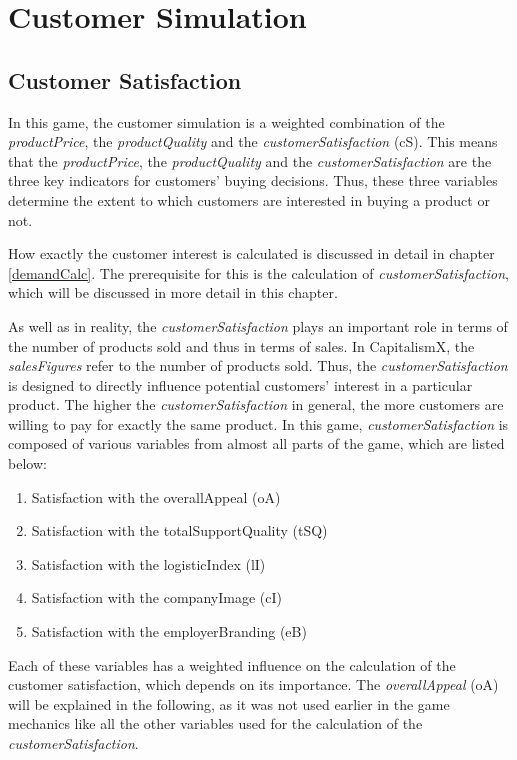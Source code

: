 \section{Customer Simulation} \label{sec:customsim}

\subsection{Customer Satisfaction}
In this game, the customer simulation is a weighted combination of the \textit{productPrice}, the \textit{productQuality} and the \textit{customerSatisfaction} (\gls{cS}).
This means that the \textit{productPrice}, the \textit{productQuality} and the \textit{customerSatisfaction} are the three key indicators for customers' buying decisions. Thus, these three variables determine the extent to which customers are interested in buying a product or not.

How exactly the customer interest is calculated is discussed in detail in chapter \ref{demandCalc}. The prerequisite for this is the calculation of \textit{customerSatisfaction}, which will be discussed in more detail in this chapter.

As well as in reality, the \textit{customerSatisfaction} plays an important role in terms of the number of products sold and thus in terms of sales. \cite{deptolla_effects_2004} In CapitalismX, the \textit{salesFigures} refer to the number of products sold.
Thus, the \textit{customerSatisfaction} is designed to directly influence potential customers' interest in a particular product. The higher the \textit{customerSatisfaction} in general, the more customers are willing to pay for exactly the same product. 
In this game, \textit{customerSatisfaction} is composed of various variables from almost all parts of the game, which are listed below:
\begin{enumerate}
      \item Satisfaction with the overallAppeal (oA)
      \item Satisfaction with the totalSupportQuality (tSQ)
      \item Satisfaction with the logisticIndex (lI)
      \item Satisfaction with the companyImage (cI)
      \item Satisfaction with the employerBranding (eB)
\end{enumerate}
Each of these variables has a weighted influence on the calculation of the customer satisfaction, which depends on its importance.
The \textit{overallAppeal} (oA) will be explained in the following, as it was not used earlier in the game mechanics like all the other variables used for the calculation of the \textit{customerSatisfaction}.

